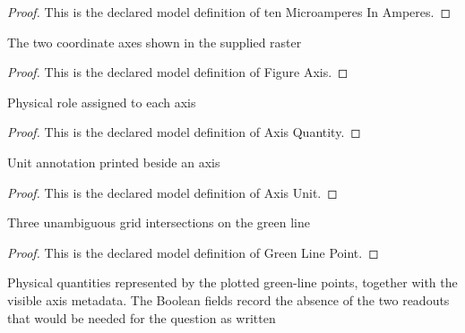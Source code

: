 \begin{proof}
  This is the declared model definition of ten Microamperes In Amperes.
\end{proof}
\begin{definition}
  \label{def:physics:phyx-mini-0498:phyxminiproblems-problemphyxmini0498-figureaxis}
  The two coordinate axes shown in the supplied raster
\end{definition}
\begin{proof}
  This is the declared model definition of Figure Axis.
\end{proof}
\begin{definition}
  \label{def:physics:phyx-mini-0498:phyxminiproblems-problemphyxmini0498-axisquantity}
  Physical role assigned to each axis
\end{definition}
\begin{proof}
  This is the declared model definition of Axis Quantity.
\end{proof}
\begin{definition}
  \label{def:physics:phyx-mini-0498:phyxminiproblems-problemphyxmini0498-axisunit}
  Unit annotation printed beside an axis
\end{definition}
\begin{proof}
  This is the declared model definition of Axis Unit.
\end{proof}
\begin{definition}
  \label{def:physics:phyx-mini-0498:phyxminiproblems-problemphyxmini0498-greenlinepoint}
  Three unambiguous grid intersections on the green line
\end{definition}
\begin{proof}
  This is the declared model definition of Green Line Point.
\end{proof}
\begin{definition}
  \label{def:physics:phyx-mini-0498:phyxminiproblems-problemphyxmini0498-stoppingpotentialfrequencyfigure}
  Physical quantities represented by the plotted green-line points, together with the visible axis metadata. The Boolean fields record the absence of the two readouts that would be needed for the question as written
\end{definition}
